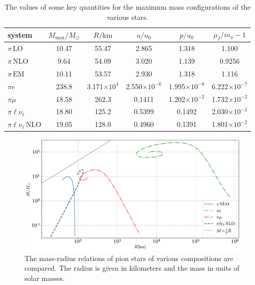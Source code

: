 \begin{table}[H]
    \centering
    \caption{The values of some key quantities for the maximum mass configurations of the various stars.}
    \label{table: key values}
    \begin{tabular}{l  c  c  c  c  c}
        \hline \hline
        system & $M_\text{max}/M_\odot$ & $R / \text{km}$ & 
        $u/u_0$ & $p/u_0$ & $\mu_I/m_\pi-1$ \\
        \hline
        $\pi\, \text{LO}$& 10.47 & 55.47 & 2.865 & 1.318 & 1.100 \\
        $\pi\, \text{NLO}$& 9.64 & 54.09 & 3.020 & 1.139 & 0.9256 \\
        $\pi\, \text{EM}$& 10.11 & 53.57 & 2.930 & 1.318 & 1.116 \\
        $\pi e$& 238.8 & 3.171$\times10^4$ & 
        2.550$\times10^{-6}$ & 1.995$\times10^{-8}$ & 
        6.222$\times10^{-7}$ \\
        $\pi \mu$& 18.58 & 262.3 & 
        0.1411 & 1.202$\times 10^{-2}$ &
        1.732$\times10^{-2}$ \\
        $\pi  \ell  \nu_\ell$& 18.80 & 125.2 &
        0.5399  & 0.1492 &
        2.030$\times10^{-2}$ \\
        $\pi  \ell \nu_\ell\,\text{NLO}$& 19.05 & 128.0 &
        0.4960  & 0.1391 &
        1.801$\times10^{-2}$ \\
        \hline
    \end{tabular}
    \vspace*{3cm}
\end{table}


\clearpage

\begin{figure}[p]
    \centering
    \includegraphics[width=.85\textwidth]{../scripts/figurer/pion_star/mass_radius_all.pdf}
    \caption{
        The mass-radius relations of pion stars of various compositions are compared.
        The radius is given in kilometers and the mass in units of solar masses.
        }
        \label{fig: mass-radius relation with leptons}
\end{figure}

